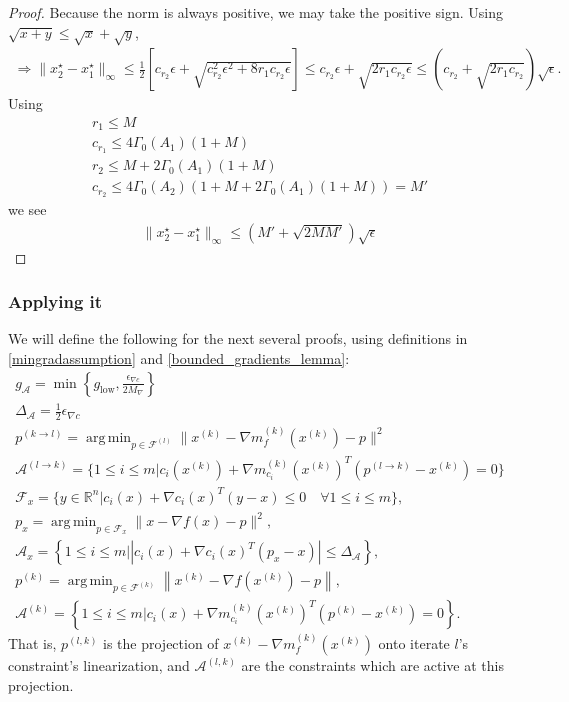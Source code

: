 \documentclass{article}
\theoremstyle{case}
\DeclareMathOperator*{\argmin}{arg\,min}
\newcommand{\feasiblek}{{\mathcal F^{(k)}}}
\newcommand{\gk}{{\nabla m_f^{(k)}(x^{(k)})}}
\newcommand{\gmcik}{{\nabla m_{c_i}^{(k)}\left(\xk\right)}}
\newcommand{\gradf}{\nabla f}
\newcommand{\huff}{{\Gamma_0}}
\newcommand{\maxgrad}{{M_{\nabla}}}
\newcommand{\minactivegraddelta}{{\Delta_{\mathcal A}}}
\newcommand{\minactivegrad}{{ g_{\mathcal A} }}
\newcommand{\mingradepsilon}{{\epsilon_{\nabla c}}}
\newcommand{\mingrad}{{ g_{\text{low}} }}
\newcommand{\Rn}{\mathbb R^n}
\newcommand{\xk}{{x^{(k)}}}
\begin{document}
\begin{proof}
Because the norm is always positive, we may take the positive sign.
Using $\sqrt{x + y} \le \sqrt{x} + \sqrt{y}$,
\begin{align*}
\Longrightarrow \|x_2^{\star} - x_1^{\star}\|_{\infty} \le \frac 1 2 \left[c_{r_2}\epsilon + \sqrt{c_{r_2}^2\epsilon^2 + 8r_1c_{r_2}\epsilon}\right] 
\le c_{r_2}\epsilon + \sqrt{2r_1c_{r_2}\epsilon}
\le \left(c_{r_2} + \sqrt{2r_1c_{r_2}}\right)\sqrt{\epsilon}.
\end{align*}
Using 
\begin{align*}
r_1 \le M \\
c_{r_1} \le 4\huff(A_1)\left(1 + M\right) \\
r_2 \le  M + 2\huff(A_1)\left(1 + M\right) \\
c_{r_2} \le  4\huff(A_2)\left(1 + M + 2\huff(A_1)\left(1 + M\right)\right) = M'
\end{align*}
we see
\begin{align*}
\|x_2^{\star} - x_1^{\star}\|_{\infty} \le \left( M' + \sqrt{2MM'}\right)\sqrt{\epsilon}
\end{align*}

\end{proof}


\subsubsection{Applying it}


We will define the following for the next several proofs, using definitions in \cref{mingradassumption} and \cref{bounded_gradients_lemma}:
\begin{align}
\minactivegrad = \min\left\{\mingrad, \frac {\mingradepsilon} {2 \maxgrad}  \right\} \label{define_minactivegrad} \\
\minactivegraddelta = \frac 1 2 \mingradepsilon \label{define_minactivedelta} \\
p^{(k \to l)} = \argmin_{p \in \mathcal F^{(l)}} \|\xk - \gk - p\|^2 \label{bp_define_plk} \\
\mathcal A^{(l \to k)} = \{1 \le i \le m | c_i(\xk) + \gmcik^T(p^{(l\to k)} - \xk) = 0 \} \label{bp_define_activep} \\
\mathcal F_x = \{ y \in \Rn | c_i(x) + \nabla c_i(x)^T(y - x) \le 0 \quad \forall 1 \le i \le m\}, \label{bp_define_true_linearization} \\
p_x = \argmin_{p \in \mathcal F_x} \|x - \gradf(x) - p\|^2, \label{bp_define_true_projection} \\
\mathcal A_x = \left\{1 \le i \le m | \left|c_i(x) + \nabla c_i(x)^T(p_x - x)\right| \le \minactivegraddelta \right\}, \label{define_projection_active} \\
p^{(k)} = \argmin_{p \in \feasiblek} \left\| \xk - \nabla f\left(\xk\right) - p \right\|, \label{bp_define_pl} \\
\mathcal A^{(k)} = \left\{1 \le i \le m | c_i(x) + \gmcik^T\left(p^{(k)} - \xk\right) = 0 \right\}. \label{bp_define_yet_another_thing}
\end{align}
That is, $p^{(l, k)}$ is the projection of $\xk - \gk$ onto iterate $l$'s constraint's linearization,
and $\mathcal A^{(l, k)}$ are the constraints which are active at this projection.
\end{document}
